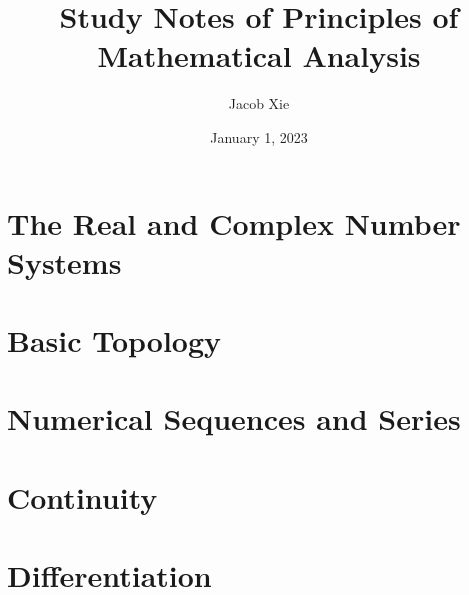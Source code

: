 \documentclass[UTF8]{ctexart}
\title{Study Notes of Principles of Mathematical Analysis}
\author{Jacob Xie}
\date{January 1, 2023}
\theoremstyle{thm}
\theoremstyle{dfn}
\theoremstyle{named}
\begin{document}
\maketitle
\newpage

\section{The Real and Complex Number Systems}

\newpage

\section{Basic Topology}




\newpage

\section{Numerical Sequences and Series}


% 
% 
% 
% 
% 
% 
% 
% 
% 
% 
% 
% 
\newpage

\section{Continuity}
% 
\newpage

\section{Differentiation}
% 
\newpage
\end{document}
